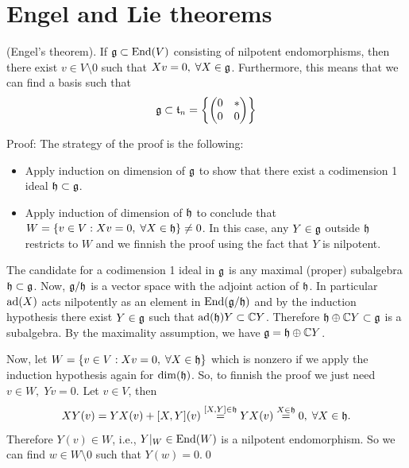 \section{Engel and Lie theorems}
\begin{dang}
    \begin{theorem}
        (Engel's theorem). If $\mathfrak{g}\subset\text{End}(V)$ consisting of nilpotent endomorphisms, then there exist 
        $v\in V\setminus0$ such that $Xv=0,\;\forall X\in\mathfrak{g}$. Furthermore, this means that we can find a basis such that 
        \begin{equation}
            \mathfrak{g}\subset \mathfrak{t}_n=\left\{
                \begin{pmatrix}
                    0&*\\
                    0&0
                \end{pmatrix}
            \right\}
        \end{equation}
    \end{theorem}
\end{dang}
Proof: The strategy of the proof is the following:
\begin{itemize}
    \item Apply induction on dimension of $\mathfrak{g}$ to show that there exist a codimension 1 ideal $\mathfrak{h}\subset\mathfrak{g}$.
    \item Apply induction of dimension of $\mathfrak{h}$ to conclude that $W=\{v\in V: Xv =0,\;\forall X\in\mathfrak{h}\}\neq0$. 
    In this case, any $Y\in\mathfrak{g}$ outside $\mathfrak{h}$ restricts to $W$ and we finnish the proof using the fact that $Y$ is 
    nilpotent.
\end{itemize}
The candidate for a codimension 1 ideal in $\mathfrak{g}$ is any maximal (proper) subalgebra $\mathfrak{h}\subset \mathfrak{g}$. Now, 
$\mathfrak{g}/\mathfrak{h}$ is a vector space with the adjoint action of $\mathfrak{h}$. In particular $\text{ad}(X)$ acts nilpotently as an 
element in $\text{End}(\mathfrak{g}/\mathfrak{h})$ and by the induction hypothesis there exist $Y\in\mathfrak{g}$ such that 
$\text{ad}(\mathfrak{h})Y\subset\mathbb{C} Y$. Therefore $\mathfrak{h}\oplus\mathbb{C} Y\subset\mathfrak{g}$ is a subalgebra. By the maximality assumption, we have 
$\mathfrak{g}=\mathfrak{h}\oplus\mathbb{C} Y$.\par 

Now, let $W=\{v\in V: Xv =0,\;\forall X\in\mathfrak{h}\}$ which is nonzero if we apply the induction hypothesis again for 
$\dim(\mathfrak{h})$. So, to finnish the proof we just need $v\in W,\;Yv=0$. Let $v\in V$, then 
\begin{equation}
    XY(v) = YX(v)+[X,Y](v)\overset{[X,Y]\in\mathfrak{h}}{=}YX(v)\overset{X\in\mathfrak{h}}{=}0,\;\forall X\in\mathfrak{h}.
\end{equation}
Therefore $Y(v)\in W$, i.e., $Y|_W\in\text{End}(W)$ is a nilpotent endomorphism. So we can find $w\in W\setminus0$ such that 
$Y(w)=0$.\qed

